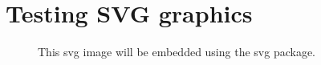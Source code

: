 \documentclass[a4paper,10pt]{article}
\newcommand{\executeiffilenewer}[3]{%
    \ifnum\pdfstrcmp{\pdffilemoddate{#1}}%
    {\pdffilemoddate{#2}}>0%
    {\immediate\write18{#3}}
    \fi%
}
\newcommand{\includesvgcustom}[2][1]{%
  \executeiffilenewer{#2.svg}{#2.pdf}{%
  /usr/bin/inkscape -z -D --file="#2.svg" --export-pdf="#2.pdf" --export-latex}%
  \scalebox{#1}{}%
}
\begin{document}
\section*{Testing SVG graphics}
\begin{figure}[htbp]
  \centering
  
  \caption{This svg image will be embedded using the svg package.}
\end{figure}


\end{document}
